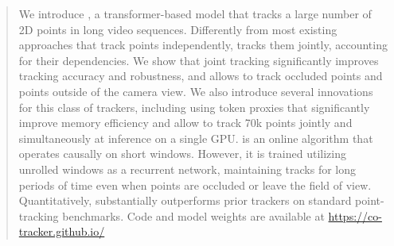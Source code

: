 \begin{abstract}
We introduce \method, a transformer-based model that tracks a large number of 2D points in long video sequences.
Differently from most existing approaches that track points independently, \method tracks them jointly, accounting for their dependencies.
We show that joint tracking significantly improves tracking accuracy and robustness, and allows \method to track occluded points and points outside of the camera view.
We also introduce several innovations for this class of trackers, including using token proxies that significantly improve memory efficiency and allow \method to track 70k points jointly and simultaneously at inference on a single GPU\@.
\method is an online algorithm that operates causally on short windows.
However, it is trained utilizing unrolled windows as a recurrent network,  maintaining tracks for long periods of time even when points are occluded or leave the field of view.
Quantitatively, \method substantially outperforms prior trackers on standard point-tracking benchmarks.
 Code and model weights are available at \href{https://co-tracker.github.io/}{https://co-tracker.github.io/}
\end{abstract}

